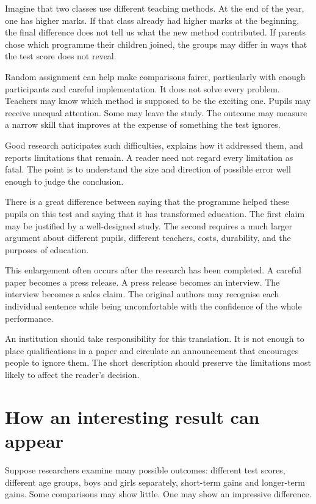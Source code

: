 \documentclass[12pt,a4paper]{book}
\begin{document}
Imagine that two classes use different teaching methods. At the end of the year, one has higher marks. If that class already had higher marks at the beginning, the final difference does not tell us what the new method contributed. If parents chose which programme their children joined, the groups may differ in ways that the test score does not reveal.

Random assignment can help make comparisons fairer, particularly with enough participants and careful implementation. It does not solve every problem. Teachers may know which method is supposed to be the exciting one. Pupils may receive unequal attention. Some may leave the study. The outcome may measure a narrow skill that improves at the expense of something the test ignores.

Good research anticipates such difficulties, explains how it addressed them, and reports limitations that remain. A reader need not regard every limitation as fatal. The point is to understand the size and direction of possible error well enough to judge the conclusion.

There is a great difference between saying that the programme helped these pupils on this test and saying that it has transformed education. The first claim may be justified by a well-designed study. The second requires a much larger argument about different pupils, different teachers, costs, durability, and the purposes of education.

This enlargement often occurs after the research has been completed. A careful paper becomes a press release. A press release becomes an interview. The interview becomes a sales claim. The original authors may recognise each individual sentence while being uncomfortable with the confidence of the whole performance.

An institution should take responsibility for this translation. It is not enough to place qualifications in a paper and circulate an announcement that encourages people to ignore them. The short description should preserve the limitations most likely to affect the reader's decision.

\section*{How an interesting result can appear}

Suppose researchers examine many possible outcomes: different test scores, different age groups, boys and girls separately, short-term gains and longer-term gains. Some comparisons may show little. One may show an impressive difference.
\end{document}
